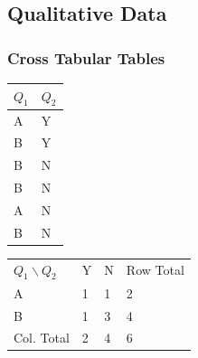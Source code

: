 \subsection{Qualitative Data}

\begin{frame}
  \frametitle{Cross Tabular Tables}

  \begin{tabular}{ll}
    $Q_{1}$ & $Q_{2}$ \\ \hline
    A & Y \\
    B & Y \\
    B & N \\
    B & N \\
    A & N \\
    B & N
  \end{tabular}

  {
    \begin{tabular}{l|l|l|l}
      $Q_1 \backslash Q_2$ & Y & N & Row Total \\
      A & 1 & 1 & 2 \\ \hline
      B & 1 & 3 & 4 \\ \hline
      Col. Total & 2 & 4 & 6
    \end{tabular}
  }

\end{frame}


